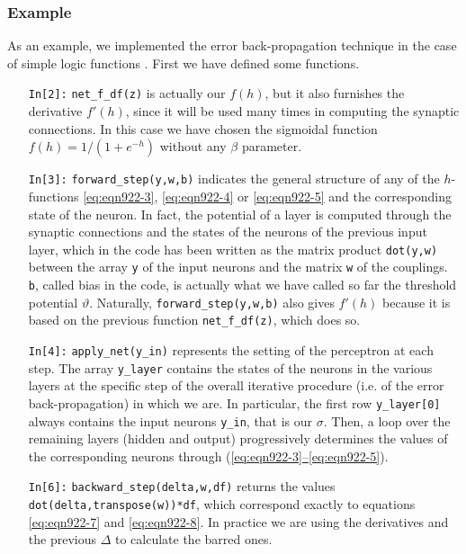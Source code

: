 \subsubsection*{Example}
As an example, we implemented the error back-propagation technique in the case of simple logic functions
. First we have defined some functions.
\begin{itemize}[align=left,labelwidth=,labelsep=5.475pt,leftmargin=\dimexpr{}+]
\item[\texttt{In[2]:}] \texttt{net\_f\_df(z)} is actually our $f(h)$, but it also furnishes the derivative $f'(h)$, since it will be used many times in computing the synaptic connections. In this case we have chosen the sigmoidal function $f(h)=1/(1+e^{-h})$ without any $\beta$ parameter.
\item[\texttt{In[3]:}] \texttt{forward\_step(y,w,b)} indicates the general structure of any of the $h$-functions \eqref{eq:eqn922-3}, \eqref{eq:eqn922-4} or \eqref{eq:eqn922-5} and the corresponding state of the neuron. In fact, the potential of a layer is computed through the synaptic connections and the states of the neurons of the previous input layer, which in the code has been written as the matrix product \texttt{dot(y,w)} between the array \texttt{y} of the input neurons and the matrix \texttt{w} of the couplings. \texttt{b}, called bias in the code, is actually what we have called so far the threshold potential $\vartheta$. Naturally, \texttt{forward\_step(y,w,b)} also gives $f'(h)$ because it is based on the previous function \texttt{net\_f\_df(z)}, which does so.
\item[\texttt{In[4]:}] \texttt{apply\_net(y\_in)} represents the setting of the perceptron at each step. The array \texttt{y\_layer} contains the states of the neurons in the various layers at the specific step of the overall iterative procedure (i.e. of the error back-propagation) in which we are. In particular, the first row \texttt{y\_layer[0]} always contains the input neurons \texttt{y\_in}, that is our $\sigma$. Then, a loop over the remaining layers (hidden and output) progressively determines the values of the corresponding neurons through (\hyperref[eq:eqn922-3]{\ref*{eq:eqn922-3}--\ref*{eq:eqn922-5}}).
\item[\texttt{In[6]:}] \texttt{backward\_step(delta,w,df)} returns the values \texttt{dot(delta,transpose(w))*df}, which correspond exactly to equations \eqref{eq:eqn922-7} and \eqref{eq:eqn922-8}. In practice we are using the derivatives and the previous $\Delta$ to calculate the barred ones.

\end{itemize}
